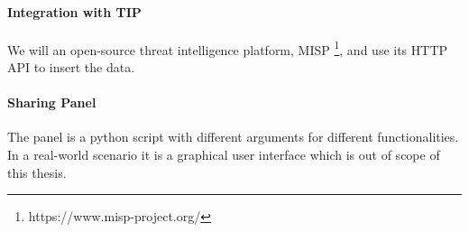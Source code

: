 \documentclass{article}
\begin{document}
\paragraph{Integration with TIP}
We will an open-source threat intelligence platform, MISP \footnote{https://www.misp-project.org/}, and use its HTTP API to insert the data.

\paragraph{Sharing Panel} The panel is a python script with different arguments for different functionalities. In a real-world scenario it is a graphical user interface which is out of scope of this thesis.





\end{document}
